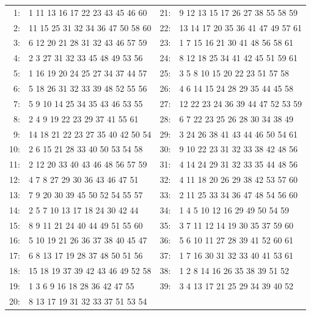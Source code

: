 \documentclass[11pt,a4paper]{article}
\theoremstyle{definition}
\theoremstyle{remark}
\begin{document}
\begin{center}
\ttfamily\footnotesize
\begin{tabular}{@{}r@{\hspace{0.8em}}l@{\hspace{1.8em}}r@{\hspace{0.8em}}l@{}}
 1: &  1 11 13 16 17 22 23 43 45 46 60 & 21: &  9 12 13 15 17 26 27 38 55 58 59 \\
 2: & 11 15 25 31 32 34 36 47 50 58 60 & 22: & 13 14 17 20 35 36 41 47 49 57 61 \\
 3: &  6 12 20 21 28 31 32 43 46 57 59 & 23: &  1  7 15 16 21 30 41 48 56 58 61 \\
 4: &  2  3 27 31 32 33 45 48 49 53 56 & 24: &  8 12 18 25 34 41 42 45 51 59 61 \\
 5: &  1 16 19 20 24 25 27 34 37 44 57 & 25: &  3  5  8 10 15 20 22 23 51 57 58 \\
 6: &  5 18 26 31 32 33 39 48 52 55 56 & 26: &  4  6 14 15 24 28 29 35 44 45 58 \\
 7: &  5  9 10 14 25 34 35 43 46 53 55 & 27: & 12 22 23 24 36 39 44 47 52 53 59 \\
 8: &  2  4  9 19 22 23 29 37 41 55 61 & 28: &  6  7 22 23 25 26 28 30 34 38 49 \\
 9: & 14 18 21 22 23 27 35 40 42 50 54 & 29: &  3 24 26 38 41 43 44 46 50 54 61 \\
10: &  2  6 15 21 28 33 40 50 53 54 58 & 30: &  9 10 22 23 31 32 33 38 42 48 56 \\
11: &  2 12 20 33 40 43 46 48 56 57 59 & 31: &  4 14 24 29 31 32 33 35 44 48 56 \\
12: &  4  7  8 27 29 30 36 43 46 47 51 & 32: &  4 11 18 20 26 29 38 42 53 57 60 \\
13: &  7  9 20 30 39 45 50 52 54 55 57 & 33: &  2 11 25 33 34 36 47 48 54 56 60 \\
14: &  2  5  7 10 13 17 18 24 30 42 44 & 34: &  1  4  5 10 12 16 29 49 50 54 59 \\
15: &  8  9 11 21 24 40 44 49 51 55 60 & 35: &  3  7 11 12 14 19 30 35 37 59 60 \\
16: &  5 10 19 21 26 36 37 38 40 45 47 & 36: &  5  6 10 11 27 28 39 41 52 60 61 \\
17: &  6  8 13 17 19 28 37 48 50 51 56 & 37: &  1  7 16 30 31 32 33 40 41 53 61 \\
18: & 15 18 19 37 39 42 43 46 49 52 58 & 38: &  1  2  8 14 16 26 35 38 39 51 52 \\
19: &  1  3  6  9 16 18 28 36 42 47 55 & 39: &  3  4 13 17 21 25 29 34 39 40 52 \\
20: &  8 13 17 19 31 32 33 37 51 53 54 &     & \\
\end{tabular}
\end{center}
\end{document}
